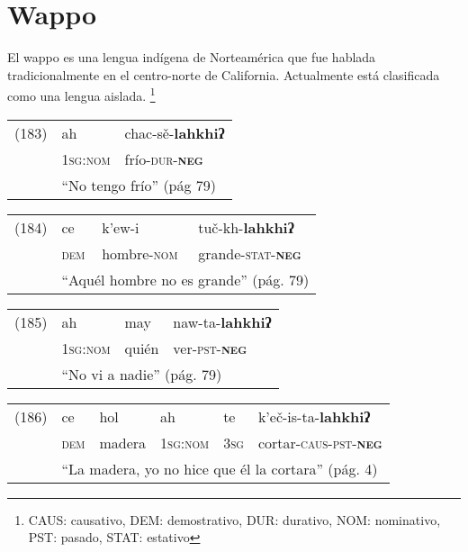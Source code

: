 \section*{Wappo}

\noindent El wappo es una lengua indígena de Norteamérica que fue hablada tradicionalmente en el centro-norte de California. Actualmente está clasificada como una lengua aislada.
\footnote{CAUS: causativo, DEM: demostrativo, DUR: durativo, NOM: nominativo, PST: pasado, STAT: estativo}
\vspace{0.5cm}

{\setmainfont{Charis SIL} 

\begin{tabular}{lll}
(183) & ah & chac-sě-\textbf{lahkhiʔ} \\
& \textsc{1sg:nom} & frío-\textsc{dur-\textbf{neg}} \\
& \multicolumn{2}{l}{``No tengo frío'' (pág 79)}
\end{tabular} \vspace{0.5cm}

\begin{tabular}{llll}
(184) & ce & k'ew-i & tuč-kh-\textbf{lahkhiʔ} \\
& \textsc{dem} & hombre-\textsc{nom} & grande-\textsc{stat-\textbf{neg}} \\
& \multicolumn{3}{l}{``Aquél hombre no es grande'' (pág. 79)}
\end{tabular} \vspace{0.5cm}

\begin{tabular}{llll}
(185) & ah & may & naw-ta-\textbf{lahkhiʔ} \\
& \textsc{1sg:nom} & quién & ver-\textsc{pst-\textbf{neg}} \\
& \multicolumn{3}{l}{``No vi a nadie'' (pág. 79)}
\end{tabular} \vspace{0.5cm}

\begin{tabular}{llllll}
(186) & ce & hol & ah & te & k'eč-is-ta-\textbf{lahkhiʔ} \\
& \textsc{dem} & madera & \textsc{1sg:nom} & \textsc{3sg} & cortar-\textsc{caus-pst-\textbf{neg}} \\
& \multicolumn{5}{l}{``La madera, yo no hice que él la cortara'' (pág. 4)}
\end{tabular} \vspace{0.5cm}

}
